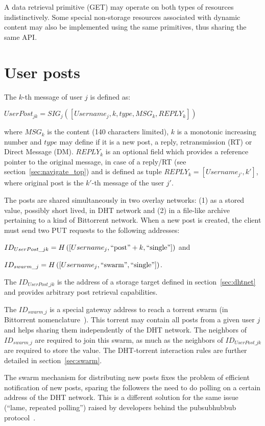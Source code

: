 \documentclass[a4paper,10pt]{article}
\begin{document}
A data retrieval primitive (GET) may operate on both types of resources indistinctively. Some special non-storage resources associated with dynamic content may also be implemented using the same primitives, thus sharing the same API.

\section{User posts}
\label{sec:userposts}

The $k$-th message of user $j$ is defined as:

$UserPost_{jk} = SIG_j( [Username_j, k, type, MSG_k, REPLY_k] )$

where $MSG_k$ is the content (140 characters limited), $k$ is a monotonic increasing number and $type$ may define if it is a new post, a reply, retransmission (RT) or Direct Message (DM). $REPLY_k$ is an optional field which provides a reference pointer to the original message, in case of a reply/RT (see section~\ref{sec:navigate_top}) and is defined as tuple $REPLY_k = [Username_{j'},{k'}]$, where original post is the $k'$-th message of the user $j'$.

The posts are shared simultaneously in two overlay networks: (1) as a stored value, possibly short lived, in DHT network and (2) in a file-like archive pertaining to a kind of Bittorrent network. When a new post is created, the client must send two PUT requests to the following addresses:

$ID_{UserPost\_jk} = H\left( [Username_j, \textnormal{``post''} + k, \textnormal{``single''}] \right)$ and

$ID_{swarm\_j} = H\left( [Username_j,\textnormal{``swarm''}, \textnormal{``single''}] \right)$. 

The $ID_{UserPost\_jk}$ is the address of a storage target defined in section~\ref{sec:dhtnet} and provides arbitrary post retrieval capabilities.

The $ID_{swarm\_j}$ is a special gateway address to reach a torrent swarm (in Bittorrent nomenclature~\cite{bittorrentterms}). This torrent may contain all posts from a given user $j$ and helps sharing them independently of the DHT network. The neighbors of $ID_{swarm\_j}$ are required to join this swarm, as much as the neighbors of $ID_{UserPost\_jk}$ are required to store the value. The DHT-torrent interaction rules are further detailed in section~\ref{sec:swarm}. 

The swarm mechanism for distributing new posts fixes the problem of efficient notification of new posts, sparing the followers the need to do polling on a certain address of the DHT network. This is a different solution for the same issue (``lame, repeated polling'') raised by developers behind the pubsubhubbub protocol~\cite{pubsubhubbub}.
\end{document}
